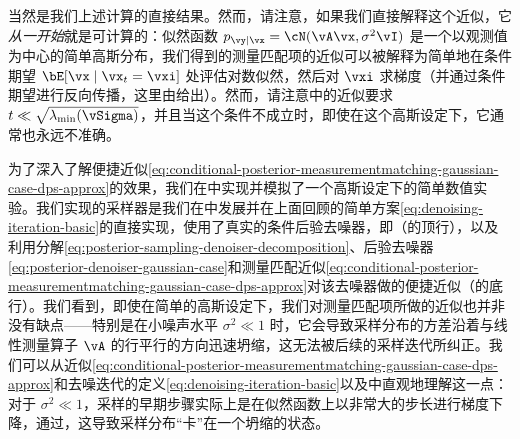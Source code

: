 \documentclass[../../book-main.tex]{subfiles}
\begin{document}
\begin{example}
  当然是我们上述计算的直接结果。然而，请注意，如果我们直接解释这个近似，它\textit{从一开始}就是可计算的：似然函数 $p_{\vy \mid \vx} = \cN(\vA\vx, \sigma^2 \vI)$ 是一个以观测值为中心的简单高斯分布，我们得到的测量匹配项的近似可以被解释为简单地在条件期望 $\bE[\vx \mid \vx_t = \vxi]$ 处评估对数似然，然后对 $\vxi$ 求梯度（并通过条件期望进行反向传播，这里由给出）。然而，请注意中的近似要求 $t \ll \sqrt{\lambda_{\min}(\vSigma)}$，并且当这个条件不成立时，即使在这个高斯设定下，它通常也永远不准确。

  为了深入了解便捷近似\eqref{eq:conditional-posterior-measurementmatching-gaussian-case-dps-approx}的效果，我们在中实现并模拟了一个高斯设定下的简单数值实验。我们实现的采样器是我们在中发展并在上面回顾的简单方案\eqref{eq:denoising-iteration-basic}的直接实现，使用了真实的条件后验去噪器，即（的顶行），以及利用分解\eqref{eq:posterior-sampling-denoiser-decomposition}、后验去噪器\eqref{eq:posterior-denoiser-gaussian-case}和测量匹配近似\eqref{eq:conditional-posterior-measurementmatching-gaussian-case-dps-approx}对该去噪器做的便捷近似（的底行）。我们看到，即使在简单的高斯设定下，我们对测量匹配项所做的近似也并非没有缺点——特别是在小噪声水平 $\sigma^2 \ll 1$ 时，它会导致采样分布的方差沿着与线性测量算子 $\vA$ 的行平行的方向迅速坍缩，这无法被后续的采样迭代所纠正。我们可以从近似\eqref{eq:conditional-posterior-measurementmatching-gaussian-case-dps-approx}和去噪迭代的定义\eqref{eq:denoising-iteration-basic}以及中直观地理解这一点：对于 $\sigma^2 \ll 1$，采样的早期步骤实际上是在似然函数上以非常大的步长进行梯度下降，通过，这导致采样分布“卡”在一个坍缩的状态。


\end{example}
\end{document}
